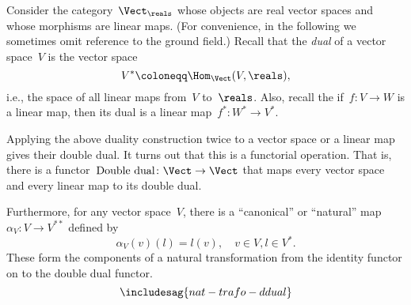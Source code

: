 \begin{example}
  Consider the category~$\Vect_{\reals}$ whose objects are real vector spaces and whose morphisms are linear maps. (For convenience, in the following we sometimes omit reference to the ground field.) Recall that the \emph{dual} of a vector space~$V$ is the vector space
  \begin{equation*}
    V^* \coloneqq \Hom_{\Vect}(V, \reals),
  \end{equation*}
  i.e., the space of all linear maps from~$V$ to~$\reals$. Also, recall the if~$f\colon V \to W$ is a linear map, then its dual is a linear map~$f^*\colon W^* \to V^*$.

  Applying the above duality construction twice to a vector space or a linear map gives their double dual. It turns out that this is a functorial operation. That is, there is a functor~$\text{Double dual}\colon \Vect \to \Vect$ that maps every vector space and every linear map to its double dual.

  Furthermore, for any vector space~$V$, there is a ``canonical'' or ``natural'' map~$\alpha_V \colon V \to V^{**}$ defined by
  \begin{equation*}
    \alpha_V(v)(l) = l(v), \quad  v \in V, l \in V^*.
  \end{equation*}
  These form the components of a natural transformation from the identity functor on \Vect to the double dual functor.
  \begin{equation}
    \includesag{nat-trafo-ddual}
  \end{equation}
\end{example}



